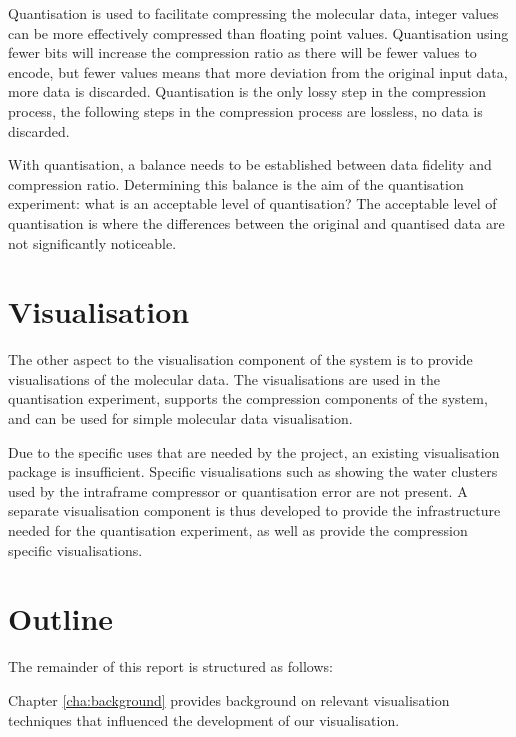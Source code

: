 Quantisation is used to facilitate compressing the molecular data, integer
values can be more effectively compressed than floating point values.
Quantisation using fewer bits will increase the compression ratio as there will
be fewer values to encode, but fewer values means that more deviation from the
original input data, more data is discarded. Quantisation is the only lossy
step in the compression process, the following steps in the compression process
are lossless, no data is discarded.

With quantisation, a balance needs to be established between data fidelity and
compression ratio. Determining this balance is the aim of the quantisation
experiment: what is an acceptable level of quantisation? The acceptable level
of quantisation is where the differences between the original and quantised
data are not significantly noticeable.


\section{Visualisation}
\label{sec:introduction_visualisation}

The other aspect to the visualisation component of the system is to provide
visualisations of the molecular data. The visualisations are used in the
quantisation experiment, supports the compression components of the system, and
can be used for simple molecular data visualisation.

Due to the specific uses that are needed by the project, an existing
visualisation package is insufficient. Specific visualisations such as showing
the water clusters used by the intraframe compressor or quantisation error are
not present. A separate visualisation component is thus developed to provide
the infrastructure needed for the quantisation experiment, as well as provide
the compression specific visualisations.


\section{Outline}
\label{sec:introduction_outline}

The remainder of this report is structured as follows:

Chapter \ref{cha:background} provides background on relevant visualisation
techniques that influenced the development of our visualisation.

